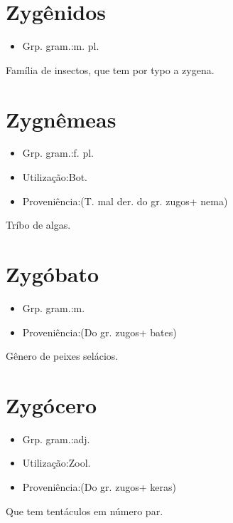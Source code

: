 \section{Zygênidos}
\begin{itemize}
\item {Grp. gram.:m. pl.}
\end{itemize}
Família de insectos, que tem por typo a zygena.
\section{Zygnêmeas}
\begin{itemize}
\item {Grp. gram.:f. pl.}
\end{itemize}
\begin{itemize}
\item {Utilização:Bot.}
\end{itemize}
\begin{itemize}
\item {Proveniência:(T. mal der. do gr. \textunderscore zugos\textunderscore  + \textunderscore nema\textunderscore )}
\end{itemize}
Tríbo de algas.
\section{Zygóbato}
\begin{itemize}
\item {Grp. gram.:m.}
\end{itemize}
\begin{itemize}
\item {Proveniência:(Do gr. \textunderscore zugos\textunderscore  + \textunderscore bates\textunderscore )}
\end{itemize}
Gênero de peixes selácios.
\section{Zygócero}
\begin{itemize}
\item {Grp. gram.:adj.}
\end{itemize}
\begin{itemize}
\item {Utilização:Zool.}
\end{itemize}
\begin{itemize}
\item {Proveniência:(Do gr. \textunderscore zugos\textunderscore  + \textunderscore keras\textunderscore )}
\end{itemize}
Que tem tentáculos em número par.

